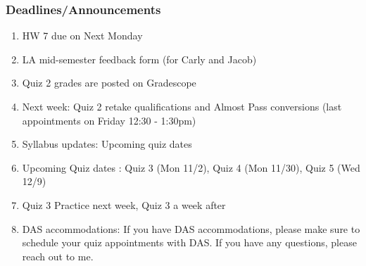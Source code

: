 
\begin{frame}
    \frametitle{Deadlines/Announcements}
        \begin{enumerate}
            \item HW 7 due on Next Monday
            \item LA mid-semester feedback form (for Carly and Jacob)
            \item Quiz 2 grades are posted on Gradescope
            \item Next week: Quiz 2 retake qualifications and Almost Pass conversions (last appointments on Friday 12:30 - 1:30pm)
            \item Syllabus updates: Upcoming quiz dates
            \item Upcoming Quiz dates : Quiz 3 (Mon 11/2), Quiz 4 (Mon 11/30), Quiz 5 (Wed 12/9)
            \item Quiz 3 Practice next week, Quiz 3 a week after
            \item DAS accommodations: If you have DAS accommodations, please make sure to schedule your quiz appointments with DAS. If you have any questions, please reach out to me.
        \end{enumerate}
\end{frame}
